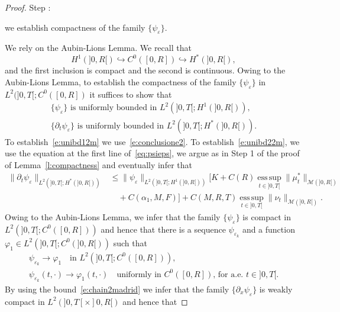 \documentclass[11pt,leqno]{amsart}
\newcounter{stepnb}
\numberwithin{equation}{section}
\begin{document}
\begin{proof}
{{{\sc \addtocounter{stepnb}{1}\noindent  Step :} {we establish compactness of the family $\{ \psi_{\varepsilon} \}$}.}}
We rely on the Aubin-Lions Lemma. We recall that 
$$
    H^1 (]0, R[) \hookrightarrow C^0 ([0, R]) \hookrightarrow H^\ast (]0, R[), 
$$ 
and the first inclusion is compact and the second is continuous. Owing to the Aubin-Lions Lemma, to establish the compactness of the family $\{ \psi_{\varepsilon} \}$ in $L^2 (]0, T[; C^0 ([0, R])$ it suffices to show that
\begin{eqnarray}
     \text{$\{ \psi_{\varepsilon} \}$ is uniformly bounded in $L^2 (]0, T[; H^1(]0, R[))$}, 
     \label{e:unibd12m}
     \\
     \text{$\{ {\partial_t} \psi_{\varepsilon} \}$ is uniformly bounded in $L^2 (]0, T[; H^\ast (]0, R[))$}.
     \label{e:unibd22m}  
\end{eqnarray} 
To establish~\eqref{e:unibd12m} we use~\eqref{e:conclusione2}. To establish~\eqref{e:unibd22m}, we use the equation at the first line 
of~\eqref{eq:psieps}, we argue as in {\sc Step 1}  of the proof of Lemma~\ref{l:compactness} and eventually infer that
\begin{equation*}
  \begin{split}
    \| {\partial_t} \psi_{\varepsilon} \|_{L^2 (]0, T[; H^\ast (]0, R[))} & \leq \|
    \psi_{\varepsilon} \|_{L^2 (]0, T[; H^1 (]0, R[))} \Big[ K + C(R)
    \operatorname*{ess\,sup}_{t \in ]0, T[}
    \| \mu_t^* \|_{\mathcal M(]0, R[)}
    \\
    & \quad + C(\alpha_1, M, F) \Big] + C(M, R, T) \operatorname*{ess\,sup}_{t \in ]0,
      T[} \| \nu_t \|_{\mathcal M(]0, R[)}.
  \end{split}
\end{equation*}
Owing to the Aubin-Lions Lemma, we infer that the family $\{ \psi_{\varepsilon} \}$
is compact in $L^2 (]0, T[; C^0 ([0, R]))$ and hence that there is a sequence $\psi_{{\varepsilon}_k}$ and a function ${\varphi}_1 \in L^2 (]0, T[; C^0 (]0, R[))$ such that
\begin{eqnarray}
  \psi_{{\varepsilon}_k}  \to 
  {\varphi}_1 \quad 
  \text{in $L^2 (]0, T[; C^0 ([0, R]))$} ,
  \label{e:aubin1} 
  \\
  \psi_{{\varepsilon}_k} (t, \cdot) \to 
  {\varphi}_1 (t, \cdot) \quad 
  \text{uniformly in $C^0 ([0, R])$, 
    for a.e. $t \in ]0, T[$}. 
  \label{e:aubin2} 
\end{eqnarray}
By using the bound~\eqref{e:chain2madrid} we infer that the family $\{ {\partial_x } \psi_{\varepsilon} \}$ is weakly compact in $L^2 (]0, T[ \times ]0, R[)$ and hence that

\end{proof}
\end{document}
